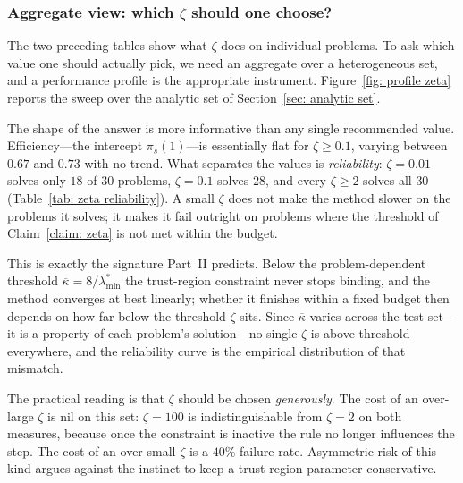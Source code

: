 \documentclass[11pt]{article}
\theoremstyle{plain}
\theoremstyle{definition}
\theoremstyle{remark}
\numberwithin{equation}{section}
\begin{document}
\subsubsection*{Aggregate view: which $\zeta$ should one choose?}

The two preceding tables show what $\zeta$ does on individual problems. To ask which value one
should actually pick, we need an aggregate over a heterogeneous set, and a performance profile is
the appropriate instrument. Figure~\ref{fig: profile zeta} reports the sweep over the analytic
set of Section~\ref{sec: analytic set}.

The shape of the answer is more informative than any single recommended value. Efficiency---the
intercept $\pi_s(1)$---is essentially flat for $\zeta \geq 0.1$, varying between $0.67$ and
$0.73$ with no trend. What separates the values is \emph{reliability}: $\zeta = 0.01$ solves only
$18$ of $30$ problems, $\zeta = 0.1$ solves $28$, and every $\zeta \geq 2$ solves all $30$
(Table~\ref{tab: zeta reliability}). A small $\zeta$ does not make the method slower on the
problems it solves; it makes it fail outright on problems where the threshold of
Claim~\ref{claim: zeta} is not met within the budget.

This is exactly the signature Part~II predicts. Below the problem-dependent threshold
$\overline{\kappa} = 8/\lambda^*_{\min}$ the trust-region constraint never stops binding, and the
method converges at best linearly; whether it finishes within a fixed budget then depends on how
far below the threshold $\zeta$ sits. Since $\overline{\kappa}$ varies across the test set---it is
a property of each problem's solution---no single $\zeta$ is above threshold everywhere, and the
reliability curve is the empirical distribution of that mismatch.

The practical reading is that $\zeta$ should be chosen \emph{generously}. The cost of an
over-large $\zeta$ is nil on this set: $\zeta = 100$ is indistinguishable from $\zeta = 2$ on both
measures, because once the constraint is inactive the rule no longer influences the step. The
cost of an over-small $\zeta$ is a $40\%$ failure rate. Asymmetric risk of this kind argues
against the instinct to keep a trust-region parameter conservative.
\end{document}
